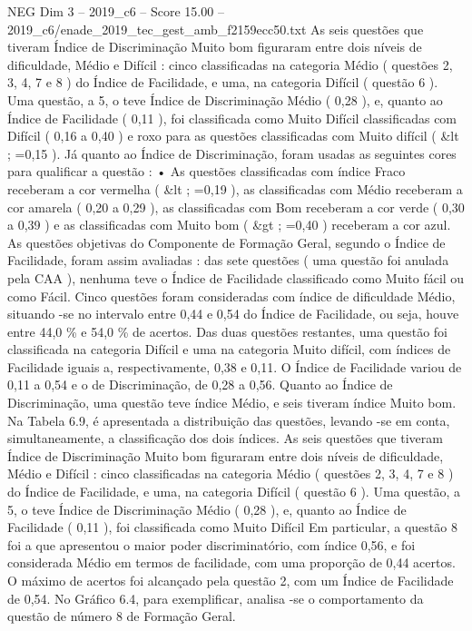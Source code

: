 \begin{textsample}{NEG Dim 3 – 2019\_c6 – Score 15.00 – 2019\_c6/enade\_2019\_tec\_gest\_amb\_f2159ecc50.txt}
As seis questões que tiveram Índice de Discriminação Muito bom figuraram entre dois níveis de dificuldade, Médio e Difícil : cinco classificadas na categoria Médio ( questões 2, 3, 4, 7 e 8 ) do Índice de Facilidade, e uma, na categoria Difícil ( questão 6 ).
Uma questão, a 5, o teve Índice de Discriminação Médio ( 0,28 ), e, quanto ao Índice de Facilidade ( 0,11 ), foi classificada como Muito Difícil classificadas com Difícil ( 0,16 a 0,40 ) e roxo para as questões classificadas com Muito difícil ( \&lt ; =0,15 ).
Já quanto ao Índice de Discriminação, foram usadas as seguintes cores para qualificar a questão : • As questões classificadas com índice Fraco receberam a cor vermelha ( \&lt ; =0,19 ), as classificadas com Médio receberam a cor amarela ( 0,20 a 0,29 ), as classificadas com Bom receberam a cor verde ( 0,30 a 0,39 ) e as classificadas com Muito bom ( \&gt ; =0,40 ) receberam a cor azul.
As questões objetivas do Componente de Formação Geral, segundo o Índice de Facilidade, foram assim avaliadas : das sete questões ( uma questão foi anulada pela CAA ), nenhuma teve o Índice de Facilidade classificado como Muito fácil ou como Fácil.
Cinco questões foram consideradas com índice de dificuldade Médio, situando -se no intervalo entre 0,44 e 0,54 do Índice de Facilidade, ou seja, houve entre 44,0 \% e 54,0 \% de acertos.
Das duas questões restantes, uma questão foi classificada na categoria Difícil e uma na categoria Muito difícil, com índices de Facilidade iguais a, respectivamente, 0,38 e 0,11.
O Índice de Facilidade variou de 0,11 a 0,54 e o de Discriminação, de 0,28 a 0,56.
Quanto ao Índice de Discriminação, uma questão teve índice Médio, e seis tiveram índice Muito bom.
Na Tabela 6.9, é apresentada a distribuição das questões, levando -se em conta, simultaneamente, a classificação dos dois índices.
As seis questões que tiveram Índice de Discriminação Muito bom figuraram entre dois níveis de dificuldade, Médio e Difícil : cinco classificadas na categoria Médio ( questões 2, 3, 4, 7 e 8 ) do Índice de Facilidade, e uma, na categoria Difícil ( questão 6 ).
Uma questão, a 5, o teve Índice de Discriminação Médio ( 0,28 ), e, quanto ao Índice de Facilidade ( 0,11 ), foi classificada como Muito Difícil Em particular, a questão 8 foi a que apresentou o maior poder discriminatório, com índice 0,56, e foi considerada Médio em termos de facilidade, com uma proporção de 0,44 acertos.
O máximo de acertos foi alcançado pela questão 2, com um Índice de Facilidade de 0,54.
No Gráfico 6.4, para exemplificar, analisa -se o comportamento da questão de número 8 de Formação Geral.

\end{textsample}
